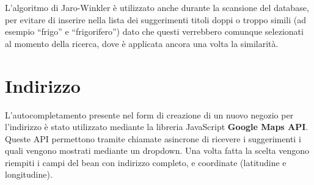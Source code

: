 L'algoritmo di Jaro-Winkler è utilizzato anche durante la scansione del database, per evitare di inserire nella lista dei suggerimenti titoli doppi o troppo simili (ad esempio ``frigo'' e ``frigorifero'') dato che questi verrebbero comunque selezionati al momento della ricerca, dove è applicata ancora una volta la similarità.

\section{Indirizzo}
L'autocompletamento presente nel form di creazione di un nuovo negozio per l'indirizzo è stato utilizzato mediante la libreria JavaScript \textbf{Google Maps API}. Queste API permettono tramite chiamate asincrone di ricevere i suggerimenti i quali vengono mostrati mediante un dropdown. Una volta fatta la scelta vengono riempiti i campi del bean con indirizzo completo, e coordinate (latitudine e longitudine).

